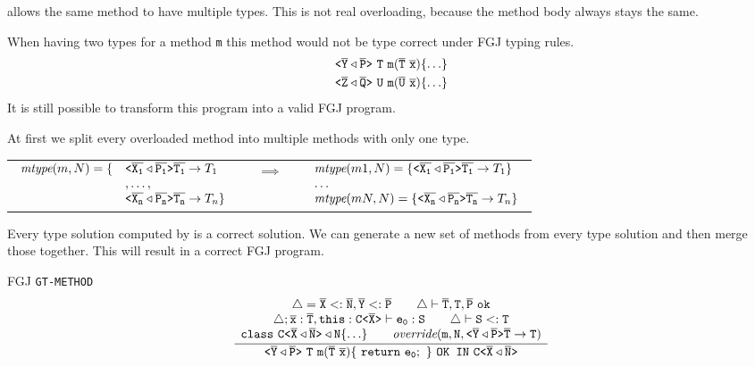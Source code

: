 \documentclass[a4paper,USenglish,cleveref, autoref, thm-restate]{lipics-v2021}
\begin{document}
\TFGJ allows the same method to have multiple types.
This is not real overloading, because the method body always stays the same.

When having two types for a method \texttt{m} this method would not be type correct under FGJ typing rules.
\begin{align*}
  \mathtt{
  \exptype{}{\ol{Y} \triangleleft \ol{P}} \ T\ \texttt{m}(\ol{T}\ \ol{x})\set{\ldots} } \\
  \mathtt{
    \exptype{}{\ol{Z} \triangleleft \ol{Q}} \ U\ \texttt{m}(\ol{U}\ \ol{x})\set{\ldots}
  }
\end{align*}
It is still possible to transform this program into a valid FGJ program.

At first we split every overloaded method into multiple methods with only one type.

\begin{small}
\begin{tabularx}{\textwidth}{cXcXc}
  $\begin{array}{rl}
    \textit{mtype}(m, N) = \{  & \mathtt{ \texttt{<} \overline{\tt X_1}\triangleleft \overline{\tt P_1} \texttt{>} } \overline{\tt T_1} \to T_1  \\
    & , \ldots , \\
    & \mathtt{ \texttt{<} \overline{\tt X_n}\triangleleft \overline{\tt P_n} \texttt{>} } \overline{\tt T_n} \to T_n \}
  \end{array}
  $ & & $\implies$ & & $\begin{array}{l}
    \textit{mtype}(m1, N) = \{   \mathtt{ \texttt{<} \overline{\tt X_1}\triangleleft \overline{\tt P_1} \texttt{>} } \overline{\tt T_1} \to T_1 \}\\
    \ldots \\
    \textit{mtype}(mN, N) = \{   \mathtt{ \texttt{<} \overline{\tt X_n}\triangleleft \overline{\tt P_n} \texttt{>} } \overline{\tt T_n} \to T_n \}\\
  \end{array}$
\end{tabularx}
\end{small}

Every type solution computed by \unify{} is a correct solution.
We can generate a new set of methods from every type solution and then merge those together.
This will result in a correct FGJ program.

FGJ \texttt{GT-METHOD}
\begin{align*}
\ddfrac{
  \begin{array}{c}
    \mathtt{\triangle = \ol{X} <: \ol{N}, \ol{Y} <: \ol{P} \quad \quad \triangle \vdash \ol{T}, T, \ol{P}\ \texttt{ok}}\\
    \mathtt{\triangle; \ol{x}:\ol{T}, \texttt{this}: \exptype{C}{\ol{X}} \vdash e_0 : S \quad \quad \triangle \vdash S <: T} \\
    \mathtt{\texttt{class}\ \exptype{C}{\ol{X} \triangleleft \ol{N}} \triangleleft N \set{\ldots} \quad \quad \textit{override}(m, N, \exptype{}{\ol{Y} \triangleleft \ol{P}} \ol{T} \to T)}
  \end{array}
}{
  \mathtt{\exptype{}{\ol{Y} \triangleleft \ol{P}}\ T\ \texttt{m}(\ol{T}\ \ol{x})\set{\ \texttt{return}\ e_0;\ } \ \texttt{OK IN}\ \exptype{C}{\ol{X} \triangleleft \ol{N}}}
}
\end{align*}
\end{document}
